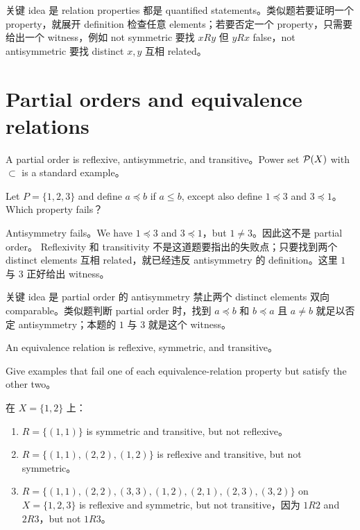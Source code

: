 \begin{explanation}
关键 idea 是 relation properties 都是 quantified statements。类似题若要证明一个 property，就展开 definition 检查任意 elements；若要否定一个 property，只需要给出一个 witness，例如 not symmetric 要找 \(xRy\) 但 \(yRx\) false，not antisymmetric 要找 distinct \(x,y\) 互相 related。
\end{explanation}

\section{Partial orders and equivalence relations}

A partial order is reflexive, antisymmetric, and transitive。Power set \(\mathcal{P}(X)\) with \(\subset\) is a standard example。

\begin{exerciseblock}
Let \(P=\{1,2,3\}\) and define \(a\preceq b\) if \(a\le b\), except also define \(1\preceq 3\) and \(3\preceq 1\)。Which property fails？
\end{exerciseblock}

\begin{solution}
Antisymmetry fails。We have \(1\preceq 3\) and \(3\preceq 1\)，but \(1\ne3\)。因此这不是 partial order。
Reflexivity 和 transitivity 不是这道题要指出的失败点；只要找到两个 distinct elements 互相 related，就已经违反 antisymmetry 的 definition。这里 \(1\) 与 \(3\) 正好给出 witness。
\end{solution}

\begin{explanation}
关键 idea 是 partial order 的 antisymmetry 禁止两个 distinct elements 双向 comparable。类似题判断 partial order 时，找到 \(a\preceq b\) 和 \(b\preceq a\) 且 \(a\ne b\) 就足以否定 antisymmetry；本题的 \(1\) 与 \(3\) 就是这个 witness。
\end{explanation}

An equivalence relation is reflexive, symmetric, and transitive。

\begin{exerciseblock}
Give examples that fail one of each equivalence-relation property but satisfy the other two。
\end{exerciseblock}

\begin{solution}
在 \(X=\{1,2\}\) 上：
\begin{enumerate}[label=\arabic*.]
  \item \(R=\{(1,1)\}\) is symmetric and transitive, but not reflexive。
  \item \(R=\{(1,1),(2,2),(1,2)\}\) is reflexive and transitive, but not symmetric。
  \item \(R=\{(1,1),(2,2),(3,3),(1,2),(2,1),(2,3),(3,2)\}\) on \(X=\{1,2,3\}\) is reflexive and symmetric, but not transitive，因为 \(1R2\) and \(2R3\)，but not \(1R3\)。
\end{enumerate}
\end{solution}

